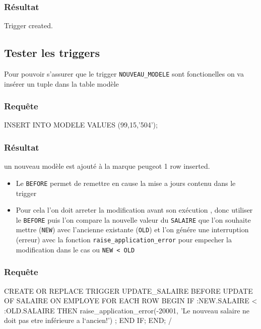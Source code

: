 \documentclass[•]{article}
\begin{document}
\subsubsection{Résultat}
\begin{sql}
Trigger created.
\end{sql}


\subsection{Tester les triggers}
Pour pouvoir s'assurer que le trigger \texttt{NOUVEAU_MODELE} sont fonctionelles on va insérer un tuple dans la table modèle
\subsubsection{Requête}
\begin{sql}
INSERT INTO MODELE VALUES (99,15,'504');
\end{sql}


\subsubsection{Résultat}
\begin{sql}
un nouveau modèle est ajouté à la marque peugeot
1 row inserted.
\end{sql}

\begin{itemize}
\item
Le \texttt{BEFORE} permet de remettre en cause la mise a jours contenu dans le trigger
\item
Pour cela l'on doit arreter la modification avant son exécution , donc utiliser le \texttt{BEFORE}
puis l'on compare la nouvelle valeur du \texttt{SALAIRE} que l'on souhaite mettre (\texttt{NEW}) avec l'ancienne existante (\texttt{OLD})
et l'on génére une interruption (erreur) avec la fonction \texttt{raise_application_error} pour empecher la modification dans le cas ou
\texttt{NEW < OLD}
\end{itemize}

\subsubsection{Requête}
\begin{sql}
CREATE OR REPLACE TRIGGER UPDATE_SALAIRE
BEFORE UPDATE OF SALAIRE ON EMPLOYE 
FOR EACH ROW
BEGIN
	IF :NEW.SALAIRE < :OLD.SALAIRE
	THEN raise_application_error(-20001, 'Le nouveau salaire ne doit pas etre inférieure a l`ancien!') ;
	END IF;
END;
/ 
\end{sql}
\end{document}

